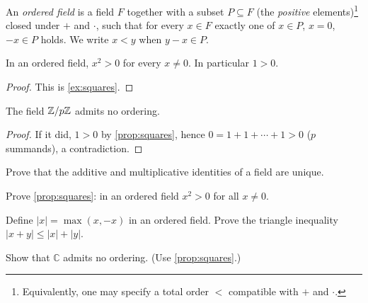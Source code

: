 \begin{definition}\label{def:ordered-field}
An \emph{ordered field} is a field $F$ together with a subset $P\subseteq F$
(the \emph{positive} elements)\footnote{Equivalently, one may specify a total
order $<$ compatible with $+$ and $\cdot$.} closed under $+$ and $\cdot$, such that for
every $x\in F$ exactly one of $x\in P$, $x=0$, $-x\in P$ holds. We write
$x<y$ when $y-x\in P$.
\end{definition}

\begin{proposition}\label{prop:squares}
In an ordered field, $x^2>0$ for every $x\neq 0$. In particular $1>0$.
\end{proposition}

\begin{proof}
This is \cref{ex:squares}.
\end{proof}

\begin{corollary}\label{cor:no-order-Zp}
The field $\mathbb{Z}/p\mathbb{Z}$ admits no ordering.
\end{corollary}

\begin{proof}
If it did, $1>0$ by \cref{prop:squares}, hence
$0 = 1 + 1 + \cdots + 1 > 0$ ($p$ summands), a contradiction.
\end{proof}

\begin{exercises}
\begin{exercise}
Prove that the additive and multiplicative identities of a field are unique.
\end{exercise}

\begin{exercise}\label{ex:squares}
Prove \cref{prop:squares}: in an ordered field $x^2>0$ for all $x\neq 0$.
\end{exercise}

\begin{exercise}\label{ex:abs-value}
Define $|x| = \max(x,-x)$ in an ordered field. Prove the triangle inequality
$|x+y|\le|x|+|y|$.
\end{exercise}

\begin{exercise}
Show that $\mathbb{C}$ admits no ordering. (Use \cref{prop:squares}.)
\end{exercise}
\end{exercises}

